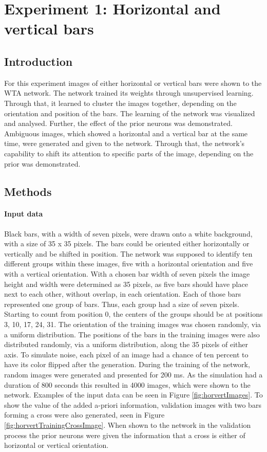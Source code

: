 \section{Experiment 1: Horizontal and vertical bars}
\label{section:horvertAdaptiveInhibition}

\subsection{Introduction}

For this experiment images of either horizontal or vertical bars were shown to the WTA network. The network trained its weights through unsupervised learning. Through that, it learned to cluster the images together, depending on the orientation and position of the bars. The learning of the network was visualized and analysed.
Further, the effect of the prior neurons was demonstrated. Ambiguous images, which showed a horizontal and a vertical bar at the same time, were generated and given to the network. Through that, the network's capability to shift its attention to specific parts of the image, depending on the prior was demonstrated.

\subsection{Methods}

\paragraph{Input data}
Black bars, with a width of seven pixels, were drawn onto a white background, with a size of 35 x 35 pixels. The bars could be oriented either horizontally or vertically and be shifted in position. The network was supposed to identify ten different groups within these images, five with a horizontal orientation and five with a vertical orientation. With a chosen bar width of seven pixels the image height and width were determined as 35 pixels, as five bars should have place next to each other, without overlap, in each orientation. Each of those bars represented one group of bars. Thus, each group had a size of seven pixels. Starting to count from position 0, the centers of the groups should be at positions 3, 10, 17, 24, 31. The orientation of the training images was chosen randomly, via a uniform distribution. The positions of the bars in the training images were also distributed randomly, via a uniform distribution, along the 35 pixels of either axis. To simulate noise, each pixel of an image had a chance of ten percent to have its color flipped after the generation.
During the training of the network, random images were generated and presented for 200 ms. As the simulation had a duration of 800 seconds this resulted in 4000 images, which were shown to the network. Examples of the input data can be seen in Figure \ref{fig:horvertImages}. To show the value of the added a-priori information, validation images with two bars forming a cross were also generated, seen in Figure \ref{fig:horvertTrainingCrossImage}. When shown to the network in the validation process the prior neurons were given the information that a cross is either of horizontal or vertical orientation.

